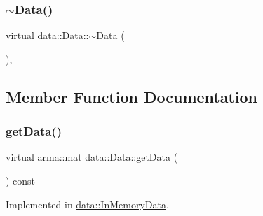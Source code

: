 \mbox{\label{classdata_1_1_data_a737d2c889ffb7c08d60b5af5846b586b}} 
\subsubsection{\texorpdfstring{$\sim$\+Data()}{~Data()}}
{\footnotesize\ttfamily virtual data\+::\+Data\+::$\sim$\+Data (\begin{DoxyParamCaption}{ }\end{DoxyParamCaption})\hspace{0.3cm}{\ttfamily [inline]}, {\ttfamily [virtual]}}



\subsection{Member Function Documentation}
\mbox{\label{classdata_1_1_data_aa4073af1bc8ccc7c50809e1676436eb4}} 
\subsubsection{\texorpdfstring{get\+Data()}{getData()}}
{\footnotesize\ttfamily virtual arma\+::mat data\+::\+Data\+::get\+Data (\begin{DoxyParamCaption}{ }\end{DoxyParamCaption}) const\hspace{0.3cm}{\ttfamily [pure virtual]}}



Implemented in \mbox{\hyperlink{classdata_1_1_in_memory_data_ac0993c38a9633fa0f1ff787660b86c71}{data\+::\+In\+Memory\+Data}}.

